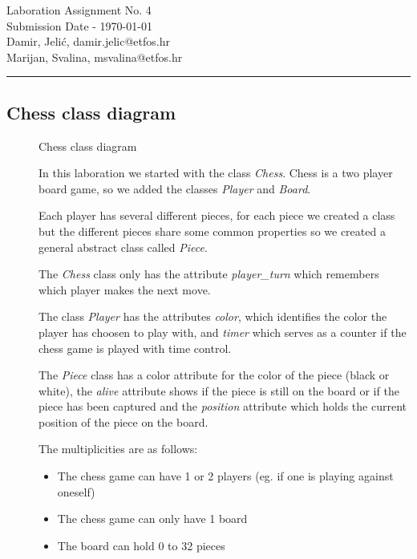 \documentclass[11pt,a4paper]{article}
\begin{document}
\large
Laboration Assignment No. 4\\
Submission Date - \yyyymmdddate \today \\
Damir, Jelić, damir.jelic@etfos.hr \\
Marijan, Svalina, msvalina@etfos.hr
\\
\rule{\linewidth}{0.1mm}

\setcounter{section}{4}
\subsection{Chess class diagram}
\begin{figure}[htb]
    \begin{center}
        \setlength\fboxsep{0pt}
        \caption{Chess class diagram}
        \label{fig:class_diag}
    \end{center}
\end{figure}

\begin{description}
    \item[]
    In this laboration we started with the class \emph{Chess}.
    Chess is a two player board game, so we added the 
    classes \emph{Player} and \emph{Board}.
    \item[]
    Each player has several different pieces, for each piece we created a class
    but the different pieces share some common properties so we created a general abstract class
    called \emph{Piece}. 
    \item[]
    The \emph{Chess} class only has the attribute \emph{player\_turn} which 
    remembers which player makes the next move.
    \item[]
    The class \emph{Player} has the attributes \emph{color}, which identifies
    the color the player has choosen to play with, and \emph{timer} which serves as a
    counter if the chess game is played with time control.
    \item[]
    The \emph{Piece} class has a color attribute for the color of the piece (black or white),
    the \emph{alive} attribute shows if the piece is still on the board or if the piece
    has been captured and the \emph{position} attribute which holds the current position of
    the piece on the board.
    \item[]
        The multiplicities are as follows:
        \begin{itemize}
            \item The chess game can have 1 or 2 players (eg. if one is playing against oneself)
            \item The chess game can only have 1 board
            \item The board can hold 0 to 32 pieces
        \end{itemize}
\end{description}
\end{document}
